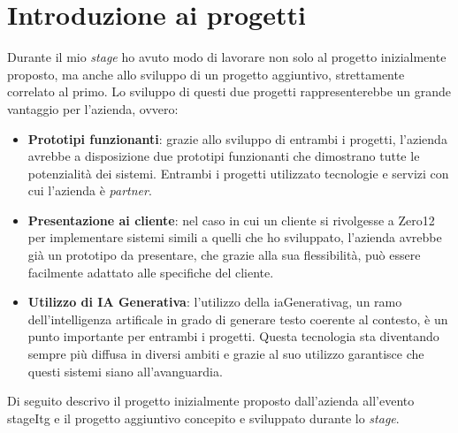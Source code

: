 \section{Introduzione ai progetti}
Durante il mio \textit{stage} ho avuto modo di lavorare non solo al progetto inizialmente proposto, ma anche allo sviluppo di un progetto aggiuntivo, strettamente correlato al primo.
Lo sviluppo di questi due progetti rappresenterebbe un grande vantaggio per l'azienda, ovvero:
\begin{itemize}
    \item \textbf{Prototipi funzionanti}: grazie allo sviluppo di entrambi i progetti, l'azienda avrebbe a disposizione due prototipi funzionanti che dimostrano tutte le potenzialità dei sistemi. Entrambi i progetti utilizzato tecnologie e servizi con cui l'azienda è \textit{partner}.
    \item \textbf{Presentazione ai cliente}: nel caso in cui un cliente si rivolgesse a Zero12 per implementare sistemi simili a quelli che ho sviluppato, l'azienda avrebbe già un prototipo da presentare, che grazie alla sua flessibilità, può essere facilmente adattato alle specifiche del cliente.
    \item \textbf{Utilizzo di IA Generativa}: l'utilizzo della \gls{iaGenerativag}, un ramo dell'intelligenza artificale in grado di generare testo coerente al contesto,  è un punto importante per entrambi i progetti. Questa tecnologia sta diventando sempre più diffusa in diversi ambiti e grazie al suo utilizzo garantisce che questi sistemi siano all'avanguardia.
\end{itemize}
\noindent
Di seguito descrivo il progetto inizialmente proposto dall'azienda all'evento \gls{stageItg} e il progetto aggiuntivo concepito e sviluppato durante lo \textit{stage}.
